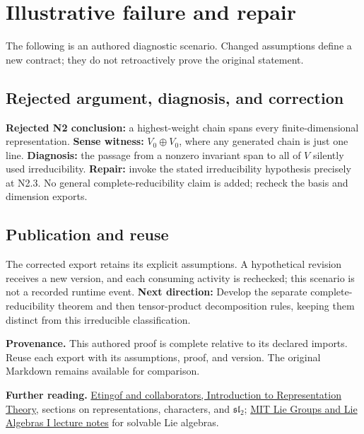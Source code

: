 \documentclass[preprint,12pt,aps,pra,showkeys,amsmath,amssymb,superscriptaddress,floatfix]{revtex4-2}
\theoremstyle{definition}
\theoremstyle{remark}
\begin{document}
\section{Illustrative failure and repair}

The following is an authored diagnostic scenario. Changed assumptions
define a new contract; they do not retroactively prove the original
statement.

\subsection{Rejected argument, diagnosis, and correction}
\textbf{Rejected N2 conclusion:} a highest-weight chain spans every
finite-dimensional representation. \textbf{Sense witness:}
\(V_0\oplus V_0\), where any generated chain is just one line.
\textbf{Diagnosis:} the passage from a nonzero invariant span to all of
\(V\) silently used irreducibility. \textbf{Repair:} invoke the stated
irreducibility hypothesis precisely at N2.3. No general
complete-reducibility claim is added; recheck the basis and dimension
exports.

\subsection{Publication and reuse}
The corrected export retains its explicit assumptions. A hypothetical
revision receives a new version, and each consuming activity is
rechecked; this scenario is not a recorded runtime event. \textbf{Next
direction:} Develop the separate complete-reducibility theorem and then
tensor-product decomposition rules, keeping them distinct from this
irreducible classification.

\par\medskip\begingroup\small\linespread{1.0}\selectfont\noindent\textbf{Provenance.} This authored proof is complete relative to its declared imports. Reuse
each export with its assumptions, proof, and version. The original
Markdown remains available for comparison.
\par\endgroup

\par\smallskip\begingroup\small\linespread{1.0}\selectfont\noindent\textbf{Further reading.} \href{https://math.mit.edu/~etingof/reprbook.pdf}{Etingof and
collaborators, Introduction to Representation Theory}, sections on
representations, characters, and \(\mathfrak{sl}_2\);
\href{https://ocw.mit.edu/courses/18-745-lie-groups-and-lie-algebras-i-fall-2020/lists/lecture-notes/}{MIT
Lie Groups and Lie Algebras I lecture notes} for solvable Lie algebras.\par\endgroup
\end{document}
